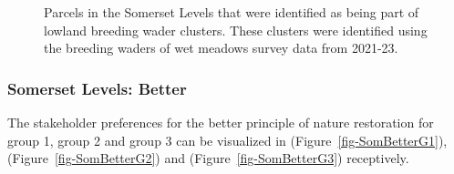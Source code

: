 \documentclass[
  12pt,
  letterpaper,
  DIV=11,
  numbers=noendperiod]{scrartcl}
\begin{document}
\begin{figure}[H]


\caption{\label{fig-SomLawton}Parcels in the Somerset Levels that were
identified as being part of lowland breeding wader clusters. These
clusters were identified using the breeding waders of wet meadows survey
data from 2021-23.}

\end{figure}%

\newpage{}

\subsubsection{Somerset Levels: Better}\label{somerset-levels-better}

The stakeholder preferences for the better principle of nature
restoration for group 1, group 2 and group 3 can be visualized in
(Figure~\ref{fig-SomBetterG1}), (Figure~\ref{fig-SomBetterG2}) and
(Figure~\ref{fig-SomBetterG3}) receptively.
\end{document}
